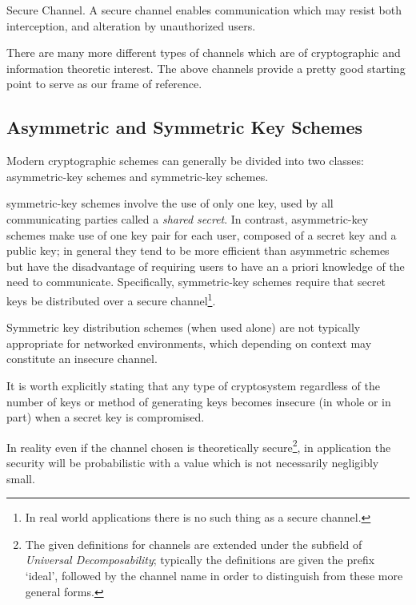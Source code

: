 \medskip
\begin{defn}{Secure Channel. }
    A \gls{secure channel} enables communication which may resist both interception, and alteration by unauthorized users.
\end{defn}

There are many more different types of channels which are of cryptographic and information theoretic interest. The above channels provide a pretty good starting point to serve as our frame of reference.



\subsection{Asymmetric and Symmetric Key Schemes}

Modern cryptographic schemes can generally be divided into two classes: \gls{asymmetric-key} schemes and \gls{symmetric-key} schemes. 

\Gls{symmetric-key} schemes involve the use of only one key, used by all communicating parties called a \emph{\gls{shared secret}}. 
In contrast, \gls{asymmetric-key} schemes make use of one key pair for each user, composed of a \gls{secret key} and a \gls{public key}; in general they tend to be more efficient than asymmetric schemes but have the disadvantage of requiring users to have an a priori knowledge of the need to communicate. Specifically, symmetric-key schemes require that secret keys be distributed over a \gls{secure channel}\footnote{In real world applications there is no such thing as a secure channel.}. 

Symmetric key distribution schemes (when used alone) are not typically appropriate for networked environments, which depending on context may constitute an \gls{insecure channel}. 

\begin{rem}
    It is worth explicitly stating that any type of cryptosystem regardless of the number of keys or method of generating keys becomes insecure (in whole or in part) when a secret key is compromised. 
    
    In reality even if the channel chosen is theoretically secure\footnote{The given definitions for channels are extended under the subfield of \textit{Universal Decomposability}; typically the definitions are given the prefix `ideal', followed by the channel name in order to distinguish from these more general forms.}, in application the security will be probabilistic with a value which is not necessarily negligibly small. 
\end{rem}

